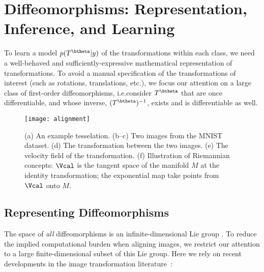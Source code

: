 \documentclass[twoside]{article}
\begin{document}
  \section{Diffeomorphisms: Representation, Inference, and Learning}
To learn a model $p(T^{\btheta} | y)$ of the transformations within each class,
we need a well-behaved and sufficiently-expressive mathematical representation of transformations.
To avoid a manual specification of the transformations of interest (such as rotations, translations, etc.),
we focus our attention on a large class of first-order 
diffeomorphisms, i.e.\we consider $T^{\btheta}$ that are once differentiable, 
and whose inverse, $(T^{\btheta})^{-1}$, exists and is differentiable as well. 

\begin{figure*}
      \centering
      \texttt{[image: alignment]}
      \caption{(a) An example tesselation.
        (b--c) Two images from the MNIST dataset.
        (d) The transformation between the two images.
        (e) The velocity field of the transformation.
        (f) Illustration of Riemannian concepts: $\Vcal$ is the tangent space
            of the manifold $M$ at the identity transformation;
            the exponential map take points from $\Vcal$ onto $M$.}
      \label{fig:alignment}
    \end{figure*}\subsection{Representing Diffeomorphisms}
    The space of \emph{all} diffeomorphisms is an infinite-dimensional Lie group \cite{arnold1989mathematical}.
    To reduce the implied computational burden when aligning images, we restrict
    our attention to a large finite-dimensional subset of this Lie group.
    Here we rely on recent developments in the image transformation literature~\cite{freifeld2015transform}:
    
\end{document}
